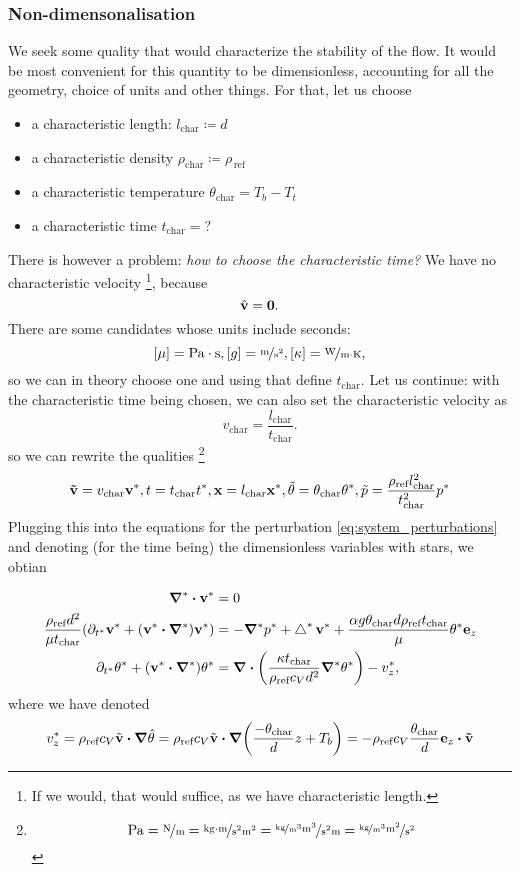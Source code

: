 \documentclass[../main.tex]{subfiles}
\begin{document}
\subsubsection{Non-dimensonalisation}
\label{sec:dimless}
We seek some quality that would characterize the stability of the flow. It would be most convenient for this quantity to be dimensionless, accounting for all the geometry, choice of units and other things. For that, let us choose 
\begin{itemize}
	\item a characteristic length: $l_{\text{char}} \coloneq d$
	\item a characteristic density $\rho_{\text{char}} \coloneq  \rho_{\, \text{ref} \,}$
	\item a characteristic temperature $\theta_{\text{char}} = T_{b}-T_{t}$
	\item a characteristic time $t_{\text{char}} = ?$
\end{itemize}
There is however a problem: \textit{how to choose the characteristic time?} We have no characteristic velocity \footnote{If we would, that would suffice, as we have characteristic length.}, because
\[
	\hat{\vb{v}} = \vb{0}.
\]
There are some candidates whose units include seconds:
\[
	[\mu] = \unit{Pa \cdot s}, [g] = \unitfrac{m}{s^{2}}, [\kappa] = \unitfrac{W}{m \cdot K},
\]
so we can in theory choose one and using that define $t_{\text{char}}.$ Let us continue: with the characteristic time being chosen, we can also set the characteristic velocity as
\[
	v_{\text{char}} = \frac{l_{\text{char}}}{t_{\text{char}}}.
\]
so we can rewrite the qualities \footnote{
	\[
		\unit{Pa} = \unitfrac{N}{m} = \unitfrac{kg \cdot m}{s^{2} m^{2}} = \unitfrac{\unitfrac{kg}{m^{3}} m^{3}}{s^{2} m} = \unitfrac{\unitfrac{kg}{m^{3}} m^{2}}{s^{2}}
	\]
}
\[
	\vb{\tilde{v}} = v_{\text{char}} \vb{v^{*}}, t = t_{\text{char}} t^{*}, \vb{x} = l_{\text{char}} \vb{x^{*}}, \tilde{\theta} = \theta_{\text{char}} \theta^{*}, \tilde{p} = \frac{\rho_{\text{ref}} l_{\text{char}}^{2}}{t_{\text{char}}^{2}} p^{*}
\]
Plugging this into the equations for the perturbation \ref{eq:system_perturbations} and denoting (for the time being) the dimensionless variables with stars, we obtian

\begin{align*}
		\grad^{*} \vdot \vb{v}^{*} &= 0 \\
		\frac{\rho_{\text{ref}}d^{2}}{\mu t_{\text{char}}}\qty(\partial_{t^{*}} \vb{v}^{*} + \qty(\vb{v}^{*} \vdot \grad^{*})\vb{v}^{*}) &= - \grad^{*} p^{*} + \laplace^{*} \vb{v}^{*} + \frac{\alpha g \theta_{\text{char}}d \rho_{\text{ref}} t_{\text{char}}}{\mu}\theta^{*} \vb{e}_z\\
		\partial_{t^{*}}\theta^{*} + \qty(\vb{v}^{*} \vdot \grad^{*})\theta^{*}&= \divergence{\qty(\frac{\kappa t_{\text{char}}}{\rho_{\text{ref}}c_V d^{2}}\grad^{*} \theta^{*})}- v^{*}_z,
\end{align*}
where we have denoted
\[
	v^{*}_z = \rho_{\text{ref}} c_V \tilde{\vb{v}}\vdot \grad \hat{\theta} = \rho_{\text{ref}} c_V \tilde{\vb{v}} \vdot \grad \qty(\frac{-\theta_{\text{char}}}{d}z + T_{b}) =- \rho_{\text{ref}} c_V \frac{\theta_{\text{char}}}{d}\vb{e}_z \vdot \vb{\tilde{v}}
\]
\end{document}
